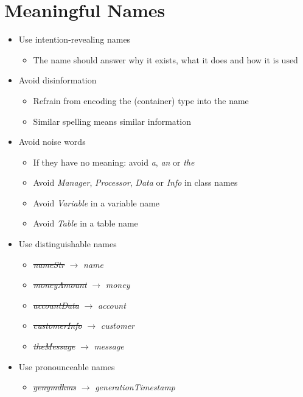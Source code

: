 \section{Meaningful Names}
\begin{itemize}
    \item Use intention-revealing names
    \begin{itemize}
        \item The name should answer why it exists, what it does and how it is used
    \end{itemize}
    \item Avoid disinformation
    \begin{itemize}
        \item Refrain from encoding the (container) type into the name
        \item Similar spelling means similar information
    \end{itemize}
    \item Avoid noise words
    \begin{itemize}
        \item If they have no meaning: avoid \textit{a}, \textit{an} or \textit{the}
        \item Avoid \textit{Manager}, \textit{Processor}, \textit{Data} or \textit{Info} in class names
        \item Avoid \textit{Variable} in a variable name
        \item Avoid \textit{Table} in a table name
    \end{itemize}
    \item Use distinguishable names
    \begin{itemize}
        \item \st{\textit{nameStr}} $\rightarrow$ \textit{name}
        \item \st{\textit{moneyAmount}} $\rightarrow$ \textit{money}
        \item \st{\textit{accountData}} $\rightarrow$ \textit{account}
        \item \st{\textit{customerInfo}} $\rightarrow$ \textit{customer}
        \item \st{\textit{theMessage}} $\rightarrow$ \textit{message}
    \end{itemize}
    \item Use pronounceable names
    \begin{itemize}
        \item \st{\textit{genymdhms}} $\rightarrow$ \textit{generationTimestamp}

\end{itemize}
\end{itemize}
